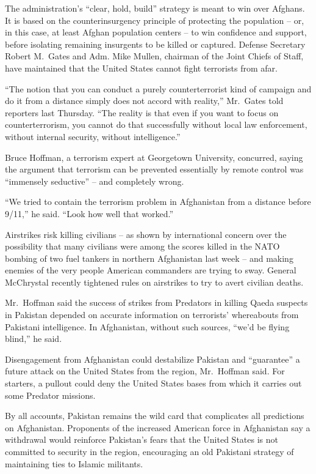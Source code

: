 ﻿\documentclass[12pt]{article}
\begin{document}
The administration's ``clear, hold, build'' strategy is meant to win over Afghans. It is based on
the counterinsurgency principle of protecting the population -- or, in this case, at least Afghan
population centers -- to win confidence and support, before isolating remaining insurgents to be
killed or captured. Defense Secretary Robert M.~Gates and Adm. Mike Mullen, chairman of the Joint
Chiefs of Staff, have maintained that the United States cannot fight terrorists from afar.

``The notion that you can conduct a purely counterterrorist kind of campaign and do it from a
distance simply does not accord with reality,'' Mr.~Gates told reporters last Thursday. ``The
reality is that even if you want to focus on counterterrorism, you cannot do that successfully
without local law enforcement, without internal security, without intelligence.''

Bruce Hoffman, a terrorism expert at Georgetown University, concurred, saying the argument that
terrorism can be prevented essentially by remote control was ``immensely seductive'' -- and
completely wrong.

``We tried to contain the terrorism problem in Afghanistan from a distance before 9/11,'' he said.
``Look how well that worked.''

Airstrikes risk killing civilians -- as shown by international concern over the possibility that
many civilians were among the scores killed in the NATO bombing of two fuel tankers in northern
Afghanistan last week -- and making enemies of the very people American commanders are trying to
sway. General McChrystal recently tightened rules on airstrikes to try to avert civilian deaths.

Mr.~Hoffman said the success of strikes from Predators in killing Qaeda suspects in Pakistan
depended on accurate information on terrorists' whereabouts from Pakistani intelligence. In
Afghanistan, without such sources, ``we'd be flying blind,'' he said.

Disengagement from Afghanistan could destabilize Pakistan and ``guarantee'' a future attack on the
United States from the region, Mr.~Hoffman said. For starters, a pullout could deny the United
States bases from which it carries out some Predator missions.

By all accounts, Pakistan remains the wild card that complicates all predictions on Afghanistan.
Proponents of the increased American force in Afghanistan say a withdrawal would reinforce
Pakistan's fears that the United States is not committed to security in the region, encouraging an
old Pakistani strategy of maintaining ties to Islamic militants.
\end{document}
